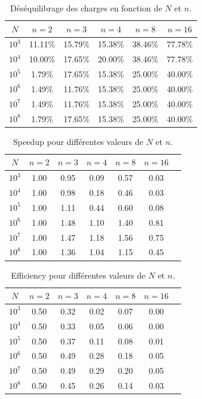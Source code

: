 \documentclass[a4paper,13pt]{book}
\begin{document}
\begin{table}[ht]
  \centering
  \caption{Déséquilibrage des charges en fonction de $ N $ et $ n $.}
  \label{tab:load_imbalance}
  \begin{tabular}{@{}cccccc@{}}
    \toprule
    $ N $ & $ n = 2 $ & $ n = 3 $ & $ n = 4 $ & $ n = 8 $ & $ n = 16 $ \\
    \midrule
    $ 10^3 $ & 11.11\% & 15.79\% & 15.38\% & 38.46\% & 77.78\% \\
    $ 10^4 $ & 10.00\% & 17.65\% & 20.00\% & 38.46\% & 77.78\% \\
    $ 10^5 $ & 1.79\% & 17.65\% & 15.38\% & 25.00\% & 40.00\% \\
    $ 10^6 $ & 1.49\% & 11.76\% & 15.38\% & 25.00\% & 40.00\% \\
    $ 10^7 $ & 1.49\% & 11.76\% & 15.38\% & 25.00\% & 40.00\% \\
    $ 10^8 $ & 1.79\% & 17.65\% & 15.38\% & 25.00\% & 40.00\% \\
    \bottomrule
  \end{tabular}
\end{table}
\begin{table}[ht]
  \centering
  \caption{Speedup pour différentes valeurs de $ N $ et $ n $.}
  \label{tab:speedup}
  \begin{tabular}{@{}ccccccc@{}}
    \toprule
    $ N $ & $ n = 2 $ & $ n = 3 $ & $ n = 4 $ & $ n = 8 $ & $ n = 16 $ \\
    \midrule
    $ 10^3 $ & 1.00 & 0.95 & 0.09 & 0.57 & 0.03 \\
    $ 10^4 $ & 1.00 & 0.98 & 0.18 & 0.46 & 0.03 \\
    $ 10^5 $ & 1.00 & 1.11 & 0.44 & 0.60 & 0.08 \\
    $ 10^6 $ & 1.00 & 1.48 & 1.10 & 1.40 & 0.81 \\
    $ 10^7 $ & 1.00 & 1.47 & 1.18 & 1.56 & 0.75 \\
    $ 10^8 $ & 1.00 & 1.36 & 1.04 & 1.15 & 0.45 \\
    \bottomrule
  \end{tabular}
\end{table}

\begin{table}[ht]
  \centering
  \caption{Efficiency pour différentes valeurs de $ N $ et $ n $.}
  \label{tab:efficiency}
  \begin{tabular}{@{}ccccccc@{}}
    \toprule
    $ N $ & $ n = 2 $ & $ n = 3 $ & $ n = 4 $ & $ n = 8 $ & $ n = 16 $ \\
    \midrule
    $ 10^3 $ & 0.50 & 0.32 & 0.02 & 0.07 & 0.00 \\
    $ 10^4 $ & 0.50 & 0.33 & 0.05 & 0.06 & 0.00 \\
    $ 10^5 $ & 0.50 & 0.37 & 0.11 & 0.08 & 0.01 \\
    $ 10^6 $ & 0.50 & 0.49 & 0.28 & 0.18 & 0.05 \\
    $ 10^7 $ & 0.50 & 0.49 & 0.29 & 0.20 & 0.05 \\
    $ 10^8 $ & 0.50 & 0.45 & 0.26 & 0.14 & 0.03 \\
    \bottomrule
  \end{tabular}
\end{table}
\end{document}
